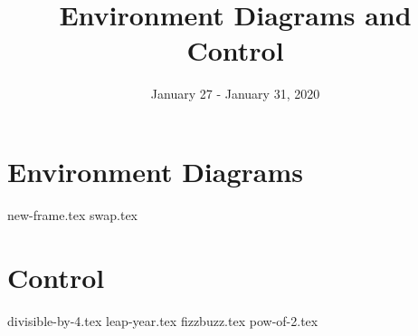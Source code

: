 \documentclass{exam}
\title{Environment Diagrams and Control}
\date{January 27 - January 31, 2020}
\begin{document}
\maketitle

\section{Environment Diagrams}
\begin{questions}
{new-frame.tex}
{swap.tex}
\end{questions}

\section{Control}
\begin{questions}
{divisible-by-4.tex}
{leap-year.tex}
{fizzbuzz.tex}
{pow-of-2.tex}
\end{questions}
\end{document}
